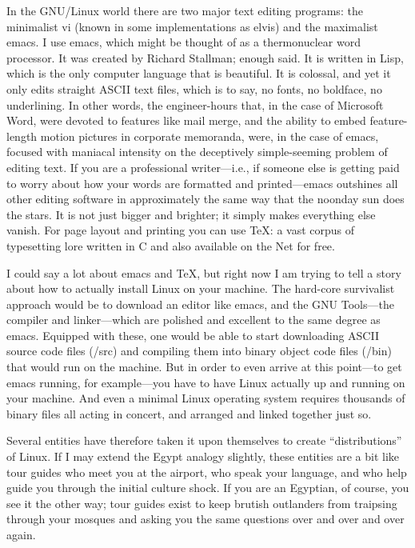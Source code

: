 \documentclass[
  fontsize=11pt,
  paper=landscape,
  twocolumn=true,
  pagesize=pdftex,
  headings=small,
  DIV=15,
  ]{scrartcl}
\begin{document}
In the GNU/Linux world there are two major text editing programs: the
minimalist vi (known in some implementations as elvis) and the
maximalist emacs. I use emacs, which might be thought of as a
thermonuclear word processor. It was created by Richard Stallman; enough
said. It is written in Lisp, which is the only computer language that is
beautiful. It is colossal, and yet it only edits straight ASCII text
files, which is to say, no fonts, no boldface, no underlining. In other
words, the engineer-hours that, in the case of Microsoft Word, were
devoted to features like mail merge, and the ability to embed
feature-length motion pictures in corporate memoranda, were, in the case
of emacs, focused with maniacal intensity on the deceptively
simple-seeming problem of editing text. If you are a professional
writer---i.e., if someone else is getting paid to worry about how your
words are formatted and printed---emacs outshines all other editing
software in approximately the same way that the noonday sun does the
stars. It is not just bigger and brighter; it simply makes everything
else vanish. For page layout and printing you can use TeX: a vast corpus
of typesetting lore written in C and also available on the Net for free.

I could say a lot about emacs and TeX, but right now I am trying to tell
a story about how to actually install Linux on your machine. The
hard-core survivalist approach would be to download an editor like
emacs, and the GNU Tools---the compiler and linker---which are polished
and excellent to the same degree as emacs. Equipped with these, one
would be able to start downloading ASCII source code files (/src) and
compiling them into binary object code files (/bin) that would run on
the machine. But in order to even arrive at this point---to get emacs
running, for example---you have to have Linux actually up and running on
your machine. And even a minimal Linux operating system requires
thousands of binary files all acting in concert, and arranged and linked
together just so.

Several entities have therefore taken it upon themselves to create
``distributions'' of Linux. If I may extend the Egypt analogy slightly,
these entities are a bit like tour guides who meet you at the airport,
who speak your language, and who help guide you through the initial
culture shock. If you are an Egyptian, of course, you see it the other
way; tour guides exist to keep brutish outlanders from traipsing through
your mosques and asking you the same questions over and over and over
again.
\end{document}
